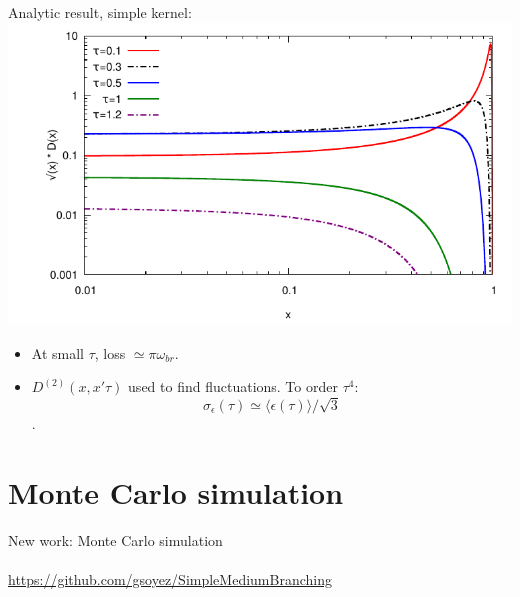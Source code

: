 \documentclass[pstricks,mathserif]{beamer}
\begin{document}
\begin{frame}[t]
Analytic result, simple kernel:
\includegraphics[width=0.9\linewidth]{plotD.pdf}

\begin{itemize}
\item At small $\tau$, loss $\simeq \pi \omega_{br}$. 
\item $D^{(2)}(x,x'\tau)$ used to find fluctuations. To order $\tau^4$:
 $$\sigma_\epsilon(\tau)\simeq \langle \epsilon(\tau)\rangle/\sqrt{3}$$.
\end{itemize}
\end{frame}


\section{Monte Carlo simulation}

\begin{frame}
\begin{center}
New work: Monte Carlo simulation\\
~\\
\url{https://github.com/gsoyez/SimpleMediumBranching}
\end{center}

\end{frame}
\end{document}
